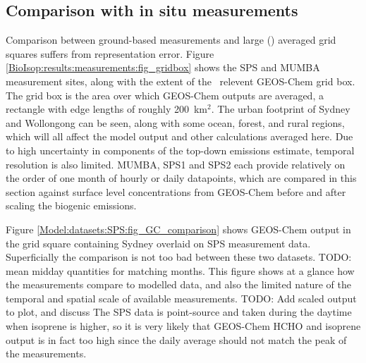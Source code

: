       
  \subsection{Comparison with in situ measurements}
    \label{BioIsop:results:measurements}
    
    Comparison between ground-based measurements and large (\lowhr) averaged grid squares suffers from representation error.
    Figure \ref{BioIsop:results:measurements:fig_gridbox} shows the SPS and MUMBA measurement sites, along with the extent of the \lowhr ~relevent GEOS-Chem grid box.
    The grid box is the area over which GEOS-Chem outputs are averaged, a rectangle with edge lengths of roughly 200~km$^{2}$.
    The urban footprint of Sydney and Wollongong can be seen, along with some ocean, forest, and rural regions, which will all affect the model output and other calculations averaged here.
    Due to high uncertainty in components of the top-down emissions estimate, temporal resolution is also limited.
    MUMBA, SPS1 and SPS2 each provide relatively on the order of one month of hourly or daily datapoints, which are compared in this section against surface level concentrations from GEOS-Chem before and after scaling the biogenic emissions.
    
    
    Figure \ref{Model:datasets:SPS:fig_GC_comparison} shows GEOS-Chem output in the grid square containing Sydney overlaid on SPS measurement data.
    Superficially the comparison is not too bad between these two datasets.
    TODO: mean midday quantities for matching months.
    This figure shows at a glance how the measurements compare to modelled data, and also the limited nature of the temporal and spatial scale of available measurements.
    TODO: Add scaled output to plot, and discuss
    The SPS data is point-source and taken during the daytime when isoprene is higher, so it is very likely that GEOS-Chem HCHO and isoprene output is in fact too high since the daily average should not match the peak of the measurements.
    
